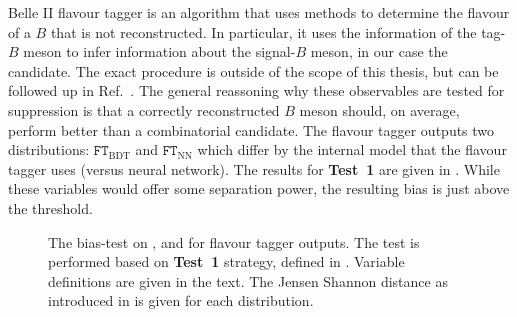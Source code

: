 Belle II flavour tagger is an algorithm that uses \MVA methods to determine the flavour of a $B$ that is not reconstructed.
In particular, it uses the information of the tag-$B$ meson to infer information about the signal-$B$ meson, in our case the \BtoXsgamma candidate.
The exact procedure is outside of the scope of this thesis, but can be followed up in Ref.~\cite{Belle-II:2021zvj}.
The general reassoning why these observables are tested for \epem\ra\qqbar suppression is that a correctly reconstructed $B$ meson should, on average, perform better than a combinatorial \qqbar candidate.
The flavour tagger outputs two distributions: $\mathtt{FT}_{\mathrm{BDT}}$ and $\mathtt{FT}_{\mathrm{NN}}$ which differ by the internal model that the flavour tagger uses (\BDT versus neural network).
The results for \textbf{Test~1} are given in .
While these variables would offer some separation power, the resulting bias is just above the threshold.

\begin{figure}[htbp!]
    \caption{\label{fig:flavour_tagger_outputs} The bias-test on \EB, \Estar and \Mbc for flavour tagger outputs.
    The test is performed based on \textbf{Test~1} strategy, defined in .
    Variable definitions are given in the text.
    The Jensen Shannon distance as introduced in  is given for each distribution.
    }
\end{figure}
